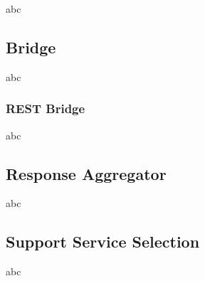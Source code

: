 abc

\subsection{Bridge}

abc

\subsubsection{REST Bridge}

abc

\subsection{Response Aggregator}

abc

\subsection{Support Service Selection}

abc